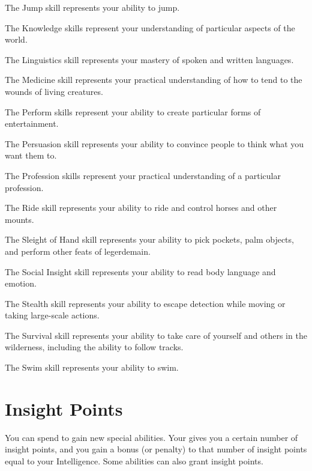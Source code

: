 \begin{raggeditemize}
        \item The Jump skill represents your ability to jump.
        \item The Knowledge skills represent your understanding of particular aspects of the world.
        \item The Linguistics skill represents your mastery of spoken and written languages.
        \item The Medicine skill represents your practical understanding of how to tend to the wounds of living creatures.
        \item The Perform skills represent your ability to create particular forms of entertainment.
        \item The Persuasion skill represents your ability to convince people to think what you want them to.
        \item The Profession skills represent your practical understanding of a particular profession.
        \item The Ride skill represents your ability to ride and control horses and other mounts.
        \item The Sleight of Hand skill represents your ability to pick pockets, palm objects, and perform other feats of legerdemain.
        \item The Social Insight skill represents your ability to read body language and emotion.
        \item The Stealth skill represents your ability to escape detection while moving or taking large-scale actions.
        \item The Survival skill represents your ability to take care of yourself and others in the wilderness, including the ability to follow tracks.
        \item The Swim skill represents your ability to swim.
    \end{raggeditemize}

\section{Insight Points}\label{Insight Points}
    You can spend  to gain new special abilities.
    Your  gives you a certain number of insight points, and you gain a bonus (or penalty) to that number of insight points equal to your Intelligence.
    Some abilities can also grant insight points.
    
